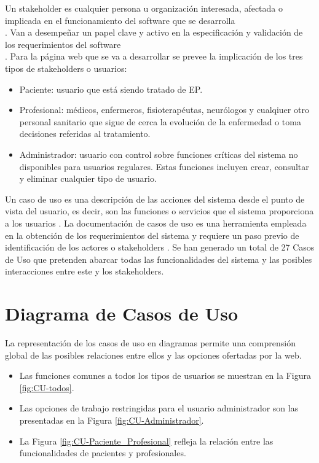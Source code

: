 
Un stakeholder es cualquier persona u organización interesada, afectada o implicada en el funcionamiento del software que se desarrolla \\ \cite{pradel2013ingenieria}. Van a desempeñar un papel clave y activo en la especificación y validación de los requerimientos del software \\ \cite{oliveros2014stakeholders}. Para la página web que se va a desarrollar se prevee la implicación de los tres tipos de stakeholders o usuarios:
\begin{itemize}
    \item Paciente: usuario que está siendo tratado de EP.
    \item Profesional: médicos, enfermeros, fisioterapéutas, neurólogos y cualqiuer otro personal sanitario que sigue de cerca la evolución de la enfermedad o toma decisiones referidas al tratamiento.
    \item Administrador: usuario con control sobre funciones críticas del sistema no disponibles para usuarios regulares. Estas funciones incluyen crear, consultar y eliminar cualquier tipo de usuario.
\end{itemize}

Un caso de uso es una descripción de las acciones del sistema desde el punto de vista del usuario, es decir, son las funciones o servicios que el sistema proporciona a los usuarios \cite{Microsof53:online}. La documentación de casos de uso es una herramienta empleada en la obtención de los requerimientos del sistema y requiere un paso previo de identificación de los actores o stakeholders \cite{UMLCasos85:online}.
Se han generado un total de 27 Casos de Uso que pretenden abarcar todas las funcionalidades del sistema y las posibles interacciones entre este y los stakeholders.



\section{Diagrama de Casos de Uso}
La representación de los casos de uso en diagramas permite una comprensión global de las posibles relaciones entre ellos y las opciones ofertadas por la web.
\begin{itemize}
    \item Las funciones comunes a todos los tipos de usuarios se muestran en la Figura \ref{fig:CU-todos}.
    \item Las opciones de trabajo restringidas para el usuario administrador son las presentadas en la Figura \ref{fig:CU-Administrador}.
    \item La Figura \ref{fig:CU-Paciente_Profesional} refleja la relación entre las funcionalidades de pacientes y profesionales.
\end{itemize}

